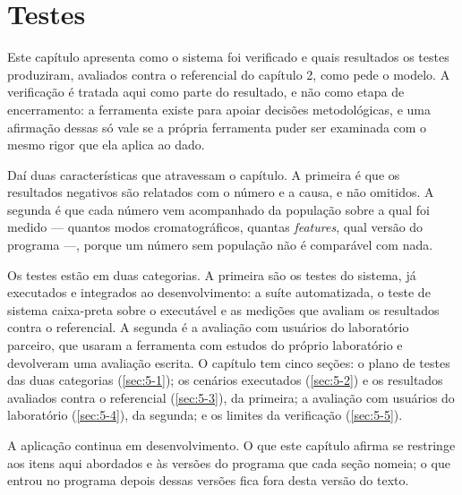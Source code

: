 
\begingroup\setlength{\emergencystretch}{3em}

\chapter{Testes}\label{cap:testes}

Este capítulo apresenta como o sistema foi verificado e quais resultados os testes produziram, avaliados contra o referencial do capítulo 2, como pede o modelo. A verificação é tratada aqui como parte do resultado, e não como etapa de encerramento: a ferramenta existe para apoiar decisões metodológicas, e uma afirmação dessas só vale se a própria ferramenta puder ser examinada com o mesmo rigor que ela aplica ao dado.

Daí duas características que atravessam o capítulo. A primeira é que os resultados negativos são relatados com o número e a causa, e não omitidos. A segunda é que cada número vem acompanhado da população sobre a qual foi medido --- quantos modos cromatográficos, quantas \textit{features}, qual versão do programa ---, porque um número sem população não é comparável com nada.

Os testes estão em duas categorias. A primeira são os testes do sistema, já executados e integrados ao desenvolvimento: a suíte automatizada, o teste de sistema caixa-preta sobre o executável e as medições que avaliam os resultados contra o referencial. A segunda é a avaliação com usuários do laboratório parceiro, que usaram a ferramenta com estudos do próprio laboratório e devolveram uma avaliação escrita. O capítulo tem cinco seções: o plano de testes das duas categorias (\ref{sec:5-1}); os cenários executados (\ref{sec:5-2}) e os resultados avaliados contra o referencial (\ref{sec:5-3}), da primeira; a avaliação com usuários do laboratório (\ref{sec:5-4}), da segunda; e os limites da verificação (\ref{sec:5-5}).

A aplicação continua em desenvolvimento. O que este capítulo afirma se restringe aos itens aqui abordados e às versões do programa que cada seção nomeia; o que entrou no programa depois dessas versões fica fora desta versão do texto.

